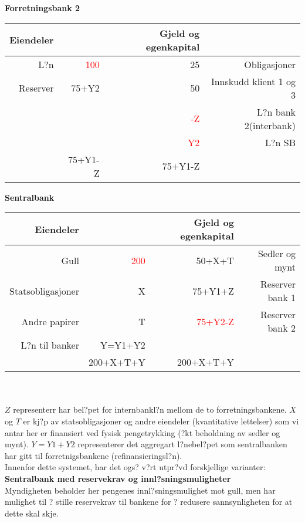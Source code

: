 \documentclass[a4paper,notitlepage]{article}
\begin{document}
\noindent \textbf{Forretningsbank 2}
\begin{center}
\begin{tabular}{rrrr}
    \textbf{Eiendeler} & \textbf{} & \textbf{Gjeld og egenkapital} & \textbf{} \\
\hline    L?n   & \textcolor{red}{100}    & 25    & Obligasjoner \\
    Reserver & 75+Y2    & 50    & Innskudd klient 1 og 3 \\
  &     & \textcolor{red}{-Z}    & L?n bank 2(interbank) \\
  &     & \textcolor{red}{Y2}    & L?n SB \\

\hline          & 75+Y1-Z    & 75+Y1-Z    &  \\
\end{tabular}%
\end{center}
\noindent \textbf{Sentralbank}
\begin{center}

\end{center}
\begin{tabular}{rrrr}
    \textbf{Eiendeler} & \textbf{} & \textbf{Gjeld og egenkapital} & \textbf{} \\
\hline    Gull   &\textcolor{red}{200}   & 50+X+T    & Sedler og mynt \\
    Statsobligasjoner & X    & 75+Y1+Z           & Reserver bank 1 \\
    Andre papirer  & T    & \textcolor{red}{75+Y2-Z}    & Reserver bank 2 \\
    L?n til banker  & Y=Y1+Y2    &     &  \\

\hline          & 200+X+T+Y    & 200+X+T+Y    &  \\
\end{tabular}%
\bigskip\\
\bigskip
\bigskip\\

$Z$ representerr har bel?pet for internbankl?n mellom de to forretningsbankene. $X$ og $T$ er kj?p av statsobligasjoner og andre eiendeler (kvantitative lettelser) som vi antar her er finansiert ved fysisk pengetrykking (?kt beholdning av sedler og mynt). $Y=Y1+Y2$ representerer det aggregart l?nebel?pet som sentralbanken har gitt til forretnigsbankene (refinansieringsl?n).
\bigskip\\

\noindent Innenfor dette systemet, har det ogs? v?rt utpr?vd forskjellige varianter: \bigskip\\
\noindent\textbf{Sentralbank med reservekrav og innl?sningsmuligheter}\\
Myndigheten beholder her pengenes innl?sningsmulighet mot gull, men har mulighet til ? stille reservekrav til bankene for ? redusere sannsynligheten for at dette skal skje.\\
\end{document}
